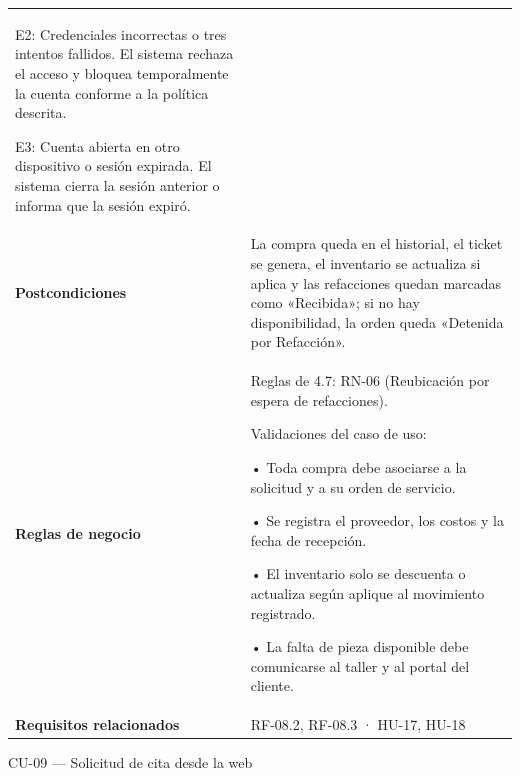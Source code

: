 {\begin{longtable}[]{@{}
  >{\raggedright\arraybackslash}p{}
  >{\raggedright\arraybackslash}p{}@{}}
E2: Credenciales incorrectas o tres intentos fallidos. El sistema
rechaza el acceso y bloquea temporalmente la cuenta conforme a la
política descrita.

E3: Cuenta abierta en otro dispositivo o sesión expirada. El sistema
cierra la sesión anterior o informa que la sesión expiró. \\
\textbf{Postcondiciones} & La compra queda en el historial, el ticket se
genera, el inventario se actualiza si aplica y las refacciones quedan
marcadas como «Recibida»; si no hay disponibilidad, la orden queda
«Detenida por Refacción». \\
\textbf{Reglas de negocio} & Reglas de 4.7: RN-06 (Reubicación por
espera de refacciones).

Validaciones del caso de uso:

• Toda compra debe asociarse a la solicitud y a su orden de servicio.

• Se registra el proveedor, los costos y la fecha de recepción.

• El inventario solo se descuenta o actualiza según aplique al
movimiento registrado.

• La falta de pieza disponible debe comunicarse al taller y al portal
del cliente. \\
\textbf{Requisitos relacionados} & RF-08.2, RF-08.3 · HU-17, HU-18 \\
\end{longtable}
}

CU-09 --- Solicitud de cita desde la web

